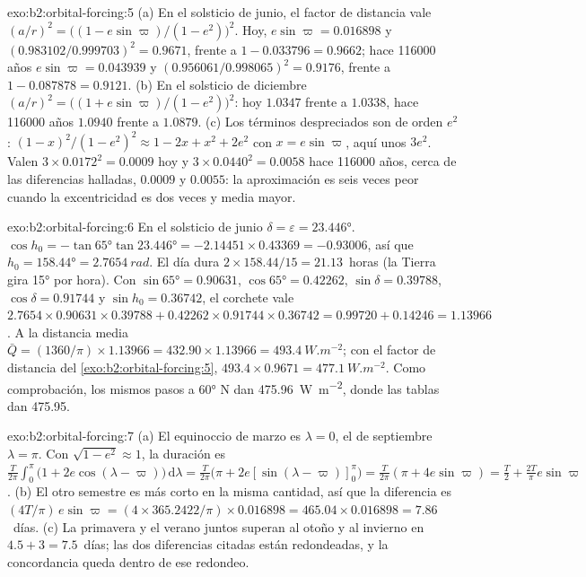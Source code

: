 \begin{solution}{exo:b2:orbital-forcing:5}
(a) En el solsticio de junio, el factor de distancia vale $(a/r)^2 = \bigl((1 - e\sin\varpi)/(1 - e^2)\bigr)^2$. Hoy, $e\sin\varpi
= 0.016898$ y $(0.983102/0.999703)^2 = 0.9671$, frente a $1 - 0.033796 = 0.9662$;
hace \num{116000} años $e\sin\varpi = 0.043939$ y $(0.956061/0.998065)^2 = 0.9176$, frente a $1 -
0.087878 = 0.9121$. (b) En el solsticio de diciembre $(a/r)^2 = \bigl((1 + e\sin\varpi)/(1 -
e^2)\bigr)^2$: hoy $1.0347$ frente a $1.0338$, hace \num{116000} años $1.0940$ frente a $1.0879$.
(c) Los términos despreciados son de orden $e^2$: $(1 - x)^2/(1 - e^2)^2 \approx 1 - 2x + x^2 + 2e^2$
con $x = e\sin\varpi$, aquí unos $3e^2$. Valen $3 \times 0.0172^2 = 0.0009$ hoy y $3
\times 0.0440^2 = 0.0058$ hace \num{116000} años, cerca de las diferencias halladas, $0.0009$ y
$0.0055$: la aproximación es seis veces peor cuando la excentricidad es dos veces y media
mayor.
\end{solution}

\begin{solution}{exo:b2:orbital-forcing:6}
En el solsticio de junio $\delta = \varepsilon = \ang{23.446}$. $\cos h_0 = -\tan\ang{65}\tan\ang{23.446}
= -2.14451 \times 0.43369 = -0.93006$, así que $h_0 = \ang{158.44} = \qty{2.7654}{rad}$. El día dura
$2 \times 158.44/15 = 21.13$~horas (la Tierra gira \ang{15} por hora). Con $\sin\ang{65} = 0.90631$,
$\cos\ang{65} = 0.42262$, $\sin\delta = 0.39788$, $\cos\delta = 0.91744$ y $\sin h_0 = 0.36742$,
el corchete vale $2.7654 \times 0.90631 \times 0.39788 + 0.42262 \times 0.91744 \times 0.36742 = 0.99720
+ 0.14246 = 1.13966$. A la distancia media $\bar Q = (1360/\pi) \times 1.13966 = 432.90 \times 1.13966
= \qty{493.4}{W.m^{-2}}$; con el factor de distancia del \cref{exo:b2:orbital-forcing:5}, $493.4 \times
0.9671 = \qty{477.1}{W.m^{-2}}$. Como comprobación, los mismos pasos a \ang{60} N dan \qty{475.96}{W.m^{-2}}, donde las tablas dan \num{475.95}.
\end{solution}

\begin{solution}{exo:b2:orbital-forcing:7}
(a) El equinoccio de marzo es $\lambda = 0$, el de septiembre $\lambda = \pi$. Con $\sqrt{1 - e^2}
\approx 1$, la duración es $\frac{T}{2\pi}\int_0^{\pi}\bigl(1 + 2e\cos(\lambda -
\varpi)\bigr)\,\mathrm d\lambda = \frac{T}{2\pi}\bigl(\pi + 2e[\sin(\lambda - \varpi)]_0^{\pi}\bigr)
= \frac{T}{2\pi}(\pi + 4e\sin\varpi) = \frac T2 + \frac{2T}{\pi}e\sin\varpi$. (b) El otro semestre
es más corto en la misma cantidad, así que la diferencia es $(4T/\pi)\,e\sin\varpi = (4 \times
365.2422/\pi) \times 0.016898 = 465.04 \times 0.016898 = 7.86$~días. (c) La primavera y el verano juntos
superan al otoño y al invierno en $4.5 + 3 = 7.5$~días; las dos diferencias citadas están redondeadas, y la
concordancia queda dentro de ese redondeo.
\end{solution}

